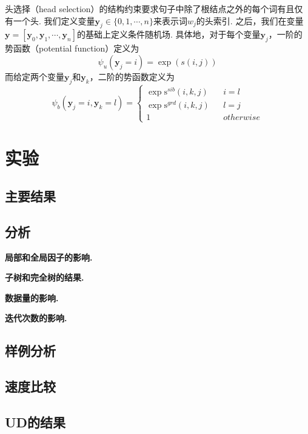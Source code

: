 头选择（head selection）的结构约束要求句子中除了根结点之外的每个词有且仅有一个头.
我们定义变量$\boldsymbol{y}_j\in \{0,1,\cdots,n\}$来表示词$w_j$的头索引.
之后，我们在变量$\boldsymbol{y}= [\boldsymbol{y}_0,\boldsymbol{y}_1,\cdots,\boldsymbol{y}_n]$的基础上定义条件随机场.
具体地，对于每个变量$\boldsymbol{y}_j$，一阶的势函数（potential function）定义为
\begin{equation}
    \label{eq:1o-potential}
    \psi_u(\boldsymbol{y}_j=i)=\exp(s(i, j))
\end{equation}
而给定两个变量$\boldsymbol{y}_j$和$\boldsymbol{y}_k$，二阶的势函数定义为
\begin{equation}
    \label{eq:2o-potential}
    \psi_b(\boldsymbol{y}_j=i,\boldsymbol{y}_k=l)=\left\{
    \begin{array}{rcl}
        \exp \mathrm{s}^{sib}(i,k,j) &  & {i=l}       \\
        \exp \mathrm{s}^{grd}(i,k,j) &  & {l=j}       \\
        1                            &  & {otherwise}
    \end{array}
    \right.
\end{equation}

\section{实验}\label{sec:dep-vi-exp}

\subsection{主要结果}



\subsection{分析}

\noindent\textbf{局部和全局因子的影响.}

\noindent\textbf{子树和完全树的结果.}

\noindent\textbf{数据量的影响.}

\noindent\textbf{迭代次数的影响.}

\subsection{样例分析}

\subsection{速度比较}

\subsection{UD的结果}
